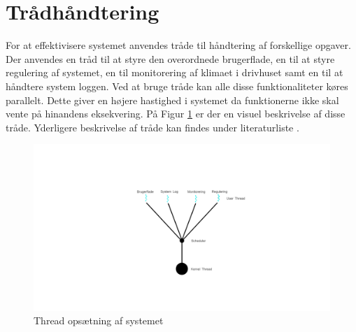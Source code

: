 \section{Trådhåndtering}
For at effektivisere systemet anvendes tråde til håndtering af forskellige opgaver. Der anvendes en tråd til at styre den overordnede brugerflade, en til at styre regulering af systemet, en til monitorering af klimaet i drivhuset samt en til at håndtere system loggen. Ved at bruge tråde kan alle disse funktionaliteter køres parallelt. Dette giver en højere hastighed i systemet da funktionerne ikke skal vente på hinandens eksekvering. På Figur \ref{fig:SD_Threads} er der en visuel beskrivelse af disse tråde. Yderligere beskrivelse af tråde kan findes under literaturliste \cite{lib:threadconcept}.

\begin{figure}[!h]
\centering 
\includegraphics[width={\textwidth-2cm}, trim=600 200 550 250, clip=true] {../fig/Threads.png}
\caption{Thread opsætning af systemet}
\label{fig:SD_Threads}
\end{figure}